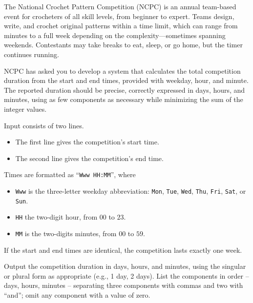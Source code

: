 


The National Crochet Pattern Competition (NCPC) is an annual team-based event for crocheters of all skill levels, from beginner to expert.
Teams design, write, and crochet original patterns within a time limit, which can range from minutes to a full week depending on the complexity---sometimes spanning weekends.
Contestants may take breaks to eat, sleep, or go home, but the timer continues running.

NCPC has asked you to develop a system that calculates the total competition duration from the start and end times, provided with weekday, hour, and minute.
The reported duration should be precise, correctly expressed in days, hours, and minutes, using as few components as necessary while minimizing the sum of the integer values.

\begin{Input}
  Input consists of two lines.

  \begin{itemize}
    \item
      The first line gives the competition's start time. 
    \item
      The second line gives the competition's end time.
  \end{itemize}

  Times are formatted as ``\texttt{Www HH:MM}'', where
  \begin{itemize}
    \item \texttt{Www} is the three-letter weekday abbreviation:
      \texttt{Mon}, 
      \texttt{Tue}, 
      \texttt{Wed}, 
      \texttt{Thu}, 
      \texttt{Fri}, 
      \texttt{Sat}, or 
      \texttt{Sun}. 
    \item
      \texttt{HH} the two-digit hour, from $00$ to $23$.
    \item \texttt{MM} is the two-digits minutes, from $00$ to $59$.
  \end{itemize}

  If the start and end times are identical, the competition lasts exactly one week.
\end{Input}

\begin{Output}
  Output the competition duration in days, hours, and minutes, using the singular or plural form as appropriate (e.g., 1 day, 2 days). 
  List the components in order -- days, hours, minutes -- separating three components with commas and two with ``and''; omit any component with a value of zero.
\end{Output}
